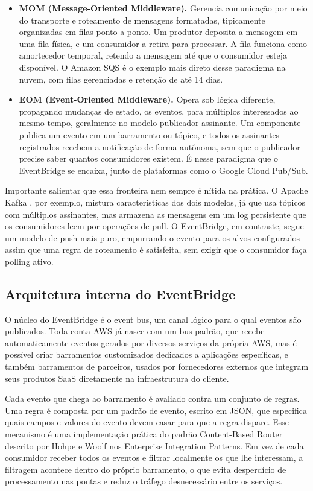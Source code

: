 \documentclass[12pt, a4paper]{article}
\begin{document}
\begin{itemize}
    \item \textbf{MOM (Message-Oriented Middleware).} Gerencia comunicação por meio do transporte e roteamento de mensagens formatadas, tipicamente organizadas em filas ponto a ponto. Um produtor deposita a mensagem em uma fila física, e um consumidor a retira para processar. A fila funciona como amortecedor temporal, retendo a mensagem até que o consumidor esteja disponível. O Amazon SQS é o exemplo mais direto desse paradigma na nuvem, com filas gerenciadas e retenção de até 14 dias.

    \item \textbf{EOM (Event-Oriented Middleware).} Opera sob lógica diferente, propagando mudanças de estado, os eventos, para múltiplos interessados ao mesmo tempo, geralmente no modelo publicador assinante. Um componente publica um evento em um barramento ou tópico, e todos os assinantes registrados recebem a notificação de forma autônoma, sem que o publicador precise saber quantos consumidores existem. É nesse paradigma que o EventBridge se encaixa, junto de plataformas como o Google Cloud Pub/Sub.
\end{itemize}

Importante salientar que essa fronteira nem sempre é nítida na prática. O Apache Kafka \cite{alaasam2019}, por exemplo, mistura características dos dois modelos, já que usa tópicos com múltiplos assinantes, mas armazena as mensagens em um log persistente que os consumidores leem por operações de pull. O EventBridge, em contraste, segue um modelo de push mais puro, empurrando o evento para os alvos configurados assim que uma regra de roteamento é satisfeita, sem exigir que o consumidor faça polling ativo.

\subsection{Arquitetura interna do EventBridge}

O núcleo do EventBridge é o event bus, um canal lógico para o qual eventos são publicados. Toda conta AWS já nasce com um bus padrão, que recebe automaticamente eventos gerados por diversos serviços da própria AWS, mas é possível criar barramentos customizados dedicados a aplicações específicas, e também barramentos de parceiros, usados por fornecedores externos que integram seus produtos SaaS diretamente na infraestrutura do cliente.

Cada evento que chega ao barramento é avaliado contra um conjunto de regras. Uma regra é composta por um padrão de evento, escrito em JSON, que especifica quais campos e valores do evento devem casar para que a regra dispare. Esse mecanismo é uma implementação prática do padrão Content-Based Router descrito por Hohpe e Woolf \cite{hohpe2003} nos Enterprise Integration Patterns. Em vez de cada consumidor receber todos os eventos e filtrar localmente os que lhe interessam, a filtragem acontece dentro do próprio barramento, o que evita desperdício de processamento nas pontas e reduz o tráfego desnecessário entre os serviços.
\end{document}
